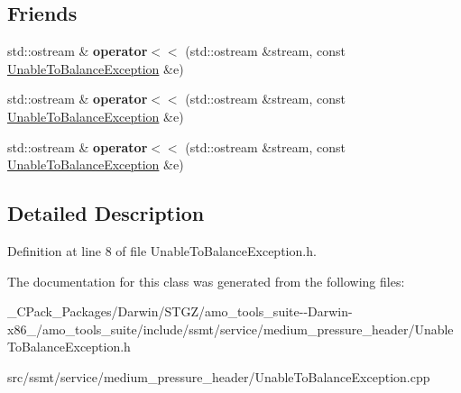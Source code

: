 \subsection*{Friends}
\begin{DoxyCompactItemize}
\item 
\mbox{\label{class_unable_to_balance_exception_aa6e21ec09f77cade73a94916673377dd}} 
std\+::ostream \& {\bfseries operator$<$$<$} (std\+::ostream \&stream, const \hyperlink{class_unable_to_balance_exception}{Unable\+To\+Balance\+Exception} \&e)
\item 
\mbox{\label{class_unable_to_balance_exception_aa6e21ec09f77cade73a94916673377dd}} 
std\+::ostream \& {\bfseries operator$<$$<$} (std\+::ostream \&stream, const \hyperlink{class_unable_to_balance_exception}{Unable\+To\+Balance\+Exception} \&e)
\item 
\mbox{\label{class_unable_to_balance_exception_aa6e21ec09f77cade73a94916673377dd}} 
std\+::ostream \& {\bfseries operator$<$$<$} (std\+::ostream \&stream, const \hyperlink{class_unable_to_balance_exception}{Unable\+To\+Balance\+Exception} \&e)
\end{DoxyCompactItemize}


\subsection{Detailed Description}


Definition at line 8 of file Unable\+To\+Balance\+Exception.\+h.



The documentation for this class was generated from the following files\+:\begin{DoxyCompactItemize}
\item 
\+\_\+\+C\+Pack\+\_\+\+Packages/\+Darwin/\+S\+T\+G\+Z/amo\+\_\+tools\+\_\+suite-\/-\/\+Darwin-\/x86\+\_/amo\+\_\+tools\+\_\+suite/include/ssmt/service/medium\+\_\+pressure\+\_\+header/Unable\+To\+Balance\+Exception.\+h\item 
src/ssmt/service/medium\+\_\+pressure\+\_\+header/Unable\+To\+Balance\+Exception.\+cpp\end{DoxyCompactItemize}
